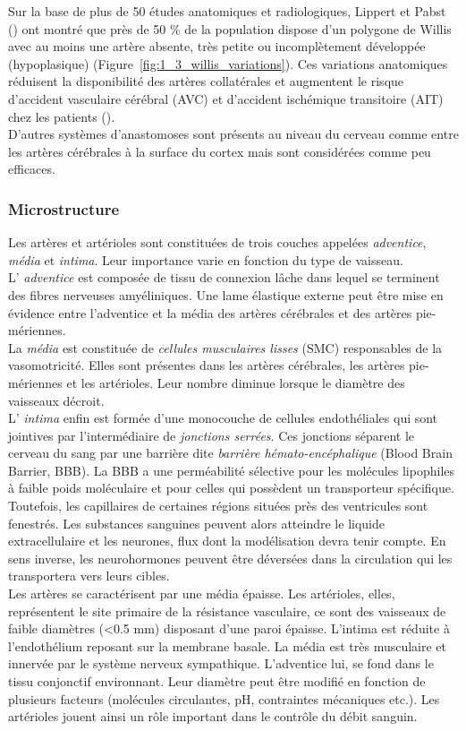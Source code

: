 Sur la base de plus de 50 études anatomiques et radiologiques, Lippert et Pabst (\cite{LippertPabst1985}) ont montré que près de 50 \% de la population dispose d’un polygone de Willis avec au moins une artère absente, très petite ou incomplètement développée (hypoplasique) (Figure~\ref{fig:1_3_willis_variations}). Ces variations anatomiques réduisent la disponibilité des artères collatérales et augmentent le risque d’accident vasculaire cérébral (AVC) et d’accident ischémique transitoire (AIT) chez les patients (\cite{Henderson2000}).\\
D’autres systèmes d’anastomoses sont présents au niveau du cerveau comme entre les artères cérébrales à la surface du cortex mais sont considérées comme peu efficaces.\\
\subsubsection{Microstructure}

Les artères et artérioles sont constituées de trois couches appelées {\em adventice},  {\em média} et  {\em intima}. Leur importance varie en fonction du type de vaisseau.\\
L’ {\em adventice} est composée de tissu de connexion lâche dans lequel se terminent des fibres nerveuses amyéliniques. Une lame élastique externe peut être mise en évidence entre l’adventice et la média des artères cérébrales et des artères pie-mériennes.\\
La  {\em média} est constituée de  {\em cellules musculaires lisses} (SMC) responsables de la vasomotricité. Elles sont présentes dans les artères cérébrales, les artères pie-mériennes et les artérioles. Leur nombre diminue lorsque le diamètre des vaisseaux décroit.\\
L’ {\em intima} enfin est formée d’une monocouche de cellules endothéliales qui sont jointives par l’intermédiaire de  {\em jonctions serrées}. Ces jonctions séparent le cerveau du sang par une barrière dite  {\em barrière hémato-encéphalique} (Blood Brain Barrier, BBB). La BBB a une perméabilité sélective pour les molécules lipophiles à faible poids moléculaire et pour celles qui possèdent un transporteur spécifique. Toutefois, les capillaires de certaines régions situées près des ventricules sont fenestrés. Les substances sanguines peuvent alors atteindre le liquide extracellulaire et les neurones, flux dont la modélisation devra tenir compte. En sens inverse, les neurohormones peuvent être déversées dans la circulation qui les transportera vers leurs cibles.\\
Les artères se caractérisent par une média épaisse. Les artérioles, elles, représentent le site primaire de la résistance vasculaire, ce sont des vaisseaux de faible diamètres (<0.5 mm) disposant d’une paroi épaisse. L’intima est réduite à l’endothélium reposant sur la membrane basale. La média est très musculaire et innervée par le système nerveux sympathique. L’adventice lui, se fond dans le tissu conjonctif environnant. Leur diamètre peut être modifié en fonction de plusieurs facteurs (molécules circulantes, pH, contraintes mécaniques etc.). Les artérioles jouent ainsi un rôle important dans le contrôle du débit sanguin.\\
